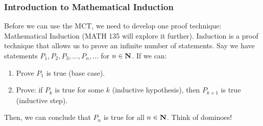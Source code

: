 \subsubsection{Introduction to Mathematical Induction}
Before we can use the MCT, we need to develop one proof technique:
Mathematical Induction (MATH 135 will explore it further).
Induction is a proof technique that allows us to prove an infinite
number of statements. Say we have statements $ P_1,P_2,P_3,\ldots,P_n,\ldots $
for $ n\in \mathbf{N} $. If we can:
\begin{enumerate}[(1)]
    \item Prove $ P_1 $ is true (base case).
    \item Prove: if $ P_k $ is true for some $ k $ (inductive hypothesis),
          then $ P_{k+1} $ is true (inductive step).
\end{enumerate}
Then, we can conclude that $ P_n $ is true for all $ n\in\mathbf{N} $. Think of dominoes!

